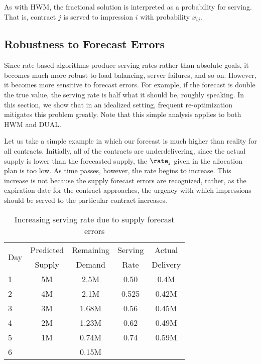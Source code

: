 As with HWM, the fractional solution is interpreted as a probability
for serving.  That is, contract $j$ is served to impression $i$ with
probability $x_{ij}$.

\subsection{Robustness to Forecast Errors}
\label{sec:robust} Since rate-based algorithms produce serving rates
rather than absolute goals, it becomes much more robust to load
balancing, server failures, and so on.  However, it becomes more
sensitive to forecast errors.  For example, if the forecast is
double the true value, the serving rate is half what it should be,
roughly speaking. In this section, we show that in an idealized
setting, frequent re-optimization mitigates this problem greatly.
Note that this simple analysis applies to both HWM and DUAL.

Let us take a simple example in which our forecast is much higher
than reality for all contracts. Initially, all of the contracts are
underdelivering, since the actual supply is lower than the
forecasted supply, the $\rate_j$ given in the allocation plan is too
low. As time passes, however, the rate begins to increase. This
increase is not because the supply forecast errors are recognized,
rather, as the expiration date for the contract approaches, the
urgency with which impressions should be served to the particular
contract increases.


\begin{table}[t]
\begin{center}
\caption{Increasing serving rate due to supply forecast errors}
\vspace{2pt}
{\begin{tabular}{|l|c|c|c|c|}
\hline
\multirow{2}{*}{Day} & Predicted & Remaining & Serving & Actual \\ & Supply & Demand & Rate & Delivery \\
\hline
1 & 5M & 2.5M & 0.50 & 0.4M \\
2 & 4M &    2.1M &  0.525 &     0.42M \\
3 & 3M & 1.68M &    0.56 &  0.45M \\
4 & 2M &    1.23M & 0.62 &  0.49M \\
5 & 1M & 0.74M &    0.74 &  0.59M\\
6 & &   0.15M & &  \\
\hline
\end{tabular}}
\label{tab:reopt}
\end{center}
\end{table}

